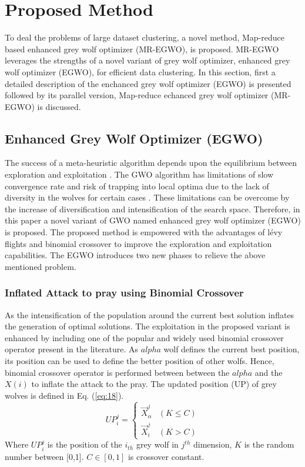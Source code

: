 \documentclass[review]{elsarticle}
\begin{document}
      \section{Proposed Method}\label{sec:pm}
     To deal the problems of large dataset clustering, a novel method, Map-reduce based enhanced grey wolf optimizer (MR-EGWO), is proposed. MR-EGWO leverages the strengths of a novel variant of grey wolf optimizer, enhanced grey wolf optimizer (EGWO), for efficient data clustering. In this section, first a detailed description of the enchanced grey wolf optimizer (EGWO) is presented followed by its parallel version, Map-reduce echanced grey wolf optimizer (MR-EGWO) is discussed.

     \subsection{Enhanced Grey Wolf Optimizer (EGWO) }  \label{sec:EGWO} 
    
    The success of a meta-heuristic algorithm depends upon the equilibrium between exploration and exploitation \cite{feoktistov2007differential}. The GWO algorithm has limitations of slow convergence rate and risk of trapping into local optima due to the lack of diversity in the wolves for certain cases \cite{zhang2015grey}. These limitations can be overcome by the increase of diversification and intensification of the search space.
Therefore, in this paper a novel variant of GWO named enhanced grey wolf optimizer (EGWO) is proposed. The proposed method is empowered with the advantages of l\'{e}vy \cite{yang2010eagle} flights and binomial crossover \cite{feoktistov2007differential} to improve the exploration and exploitation capabilities. 
   The EGWO introduces two new phases to relieve the above mentioned problem.
      \subsubsection{Inflated Attack to pray using Binomial Crossover} \label{sec:binomial}
      
    As the intensification of the population around the current best solution inflates the generation of optimal solutions. The exploitation in the proposed variant is enhanced by including one of the popular and widely used binomial crossover operator present in the literature. As $alpha$ wolf defines the current best position, its position can be used to define the better position of other wolfs. Hence, binomial crossover operator is performed between between the $alpha$ and the $X(i)$ to inflate the attack to the pray. The updated position (UP) of grey wolves is defined in Eq. (\ref{eq:18}). 
                                 \begin{equation}\label{eq:18}
                     UP_i^j=\begin{cases}\overrightarrow X_{\alpha}^j &  (K\leq C)\\{\overrightarrow X_i^j} &  (K>C)\end{cases}
               \end{equation}
   Where $UP_i^j$ is the position of the $i_{th}$ grey wolf in $j^{th}$ dimension, $K$ is the random number between [0,1]. $C \in [0,1]$ is crossover constant.      
\end{document}
